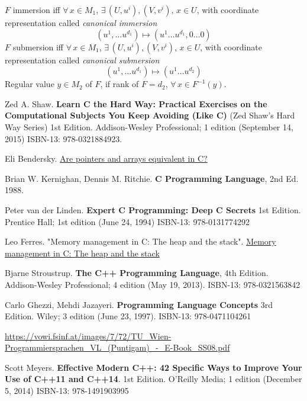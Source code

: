 \documentclass[10pt]{amsart}
\begin{document}
\begin{multicols*}{2}
$F$ immersion iff $\forall \, x \in M_1$, $\exists \, (U,u^i), (V,v^i), \, x\in U$, with coordinate representation called \emph{ canonical immersion } 
\[
(u^1, \dots u^{d_1}) \mapsto (u^1 \dots u^{d_1} , 0 \dots 0 )
\]
$F$ submersion iff $\forall \, x \in M_1$, $\exists \, (U,u^i), (V,v^i), \, x\in U$, with coordinate representation called \emph{ canonical submersion } 
\[
(u^1, \dots u^{d_1}) \mapsto (u^1 \dots u^{d_2}  )
\] 
Regular value $y \in M_2$ of $F$, if rank of $F = d_2$, $\forall \, x \in F^{-1}(y)$.  


\end{multicols*}
\begin{thebibliography}{9}

Zed A. Shaw.  \textbf{Learn C the Hard Way: Practical Exercises on the Computational Subjects You Keep Avoiding (Like C)} (Zed Shaw's Hard Way Series) 1st Edition.  Addison-Wesley Professional; 1 edition (September 14, 2015) ISBN-13: 978-0321884923.  

Eli Bendersky.   \href{https://eli.thegreenplace.net/2009/10/21/are-pointers-and-arrays-equivalent-in-c}{Are pointers and arrays equivalent in C?}

Brian W. Kernighan, Dennis M. Ritchie.  \textbf{C Programming Language}, 2nd Ed. 1988.   

Peter van der Linden.  \textbf{Expert C Programming: Deep C Secrets} 1st Edition.  Prentice Hall; 1st edition (June 24, 1994)  ISBN-13: 978-0131774292

Leo Ferres.  "Memory management in C: The heap and the stack".  \href{http://www.inf.udec.cl/~leo/teoX.pdf}{Memory management in C: The heap and the stack}



Bjarne Stroustrup.  \textbf{The C++ Programming Language}, 4th Edition. Addison-Wesley Professional; 4 edition (May 19, 2013).  ISBN-13: 978-0321563842

Carlo Ghezzi, Mehdi Jazayeri.  \textbf{Programming Language Concepts} 3rd Edition.  Wiley; 3 edition (June 23, 1997).  ISBN-13: 978-0471104261  

\url{https://vowi.fsinf.at/images/7/72/TU_Wien-Programmiersprachen_VL_(Puntigam)_-_E-Book_SS08.pdf}


Scott Meyers.  \textbf{Effective Modern C++: 42 Specific Ways to Improve Your Use of C++11 and C++14}. 1st Edition.  O'Reilly Media; 1 edition (December 5, 2014)  ISBN-13: 978-1491903995




\end{thebibliography}
\end{document}
